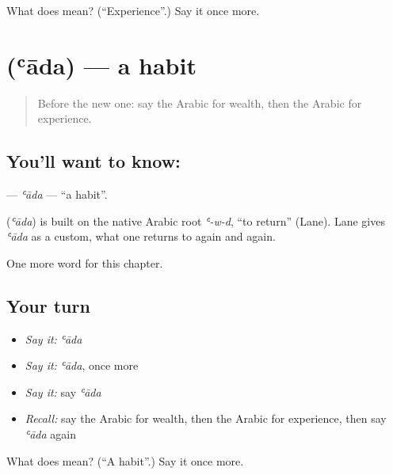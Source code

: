 \begin{tcolorbox}[breakable,colback=teal!4,colframe=teal!35!black,title={Before you move on}]
What does  mean? (\textquotedblleft{}Experience\textquotedblright{}.) Say it once more.
\end{tcolorbox}
\section[\texorpdfstring{\ar{عادة} (ʿāda)}{عادة (ʿāda)}]{ (ʿāda) — a habit}

\label{lesson:AR-C109-ada}



\begin{quote}
Before the new one: say the Arabic for wealth, then the Arabic for experience.
\end{quote}

\subsection*{You'll want to know: }
\textbf{} — \emph{ʿāda} — \textquotedblleft{}a habit\textquotedblright{}.

\begin{cousinweb}
\textbf{} (\emph{ʿāda}) is built on the native Arabic root \emph{ʿ-w-d}, \textquotedblleft{}to return\textquotedblright{} (Lane). Lane gives \emph{ʿāda} as a custom, what one returns to again and again.
\end{cousinweb}

\begin{grammarlens}[title={What you've built}]
One more word for this chapter.
\end{grammarlens}

\subsection*{Your turn}
\begin{itemize}
\raggedright
  \item \emph{Say it:} \emph{ʿāda}
  \item \emph{Say it:} \emph{ʿāda}, once more
  \item \emph{Say it:} say \emph{ʿāda}
  \item \emph{Recall:} say the Arabic for wealth, then the Arabic for experience, then say \emph{ʿāda} again
\end{itemize}

\begin{tcolorbox}[breakable,colback=teal!4,colframe=teal!35!black,title={Before you move on}]
What does  mean? (\textquotedblleft{}A habit\textquotedblright{}.) Say it once more.
\end{tcolorbox}
